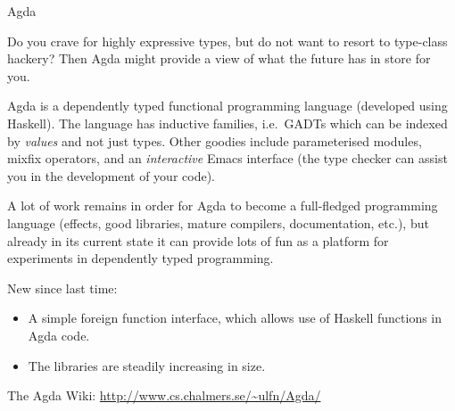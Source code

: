 \documentclass{article}
\begin{document}
\begin{hcarentry}{Agda}
\label{agda}
\makeheader

Do you crave for highly expressive types, but do not want to resort to
type-class hackery? Then Agda might provide a view of what the future
has in store for you.

Agda is a dependently typed functional programming language (developed
using Haskell). The language has inductive families, i.e.\ GADTs
which can be indexed by \emph{values} and not just types. Other
goodies include parameterised modules, mixfix operators, and an
\emph{interactive} Emacs interface (the type checker can assist you in
the development of your code).

A lot of work remains in order for Agda to become a full-fledged
programming language (effects, good libraries, mature compilers,
documentation, etc.), but already in its current state it can provide
lots of fun as a platform for experiments in dependently typed
programming.

New since last time:
\begin{itemize}
\item A simple foreign function interface, which allows use of Haskell
  functions in Agda code.
\item The libraries are steadily increasing in size.
\end{itemize}

\FurtherReading
  The Agda Wiki: \url{http://www.cs.chalmers.se/~ulfn/Agda/}
\end{hcarentry}
\end{document}
